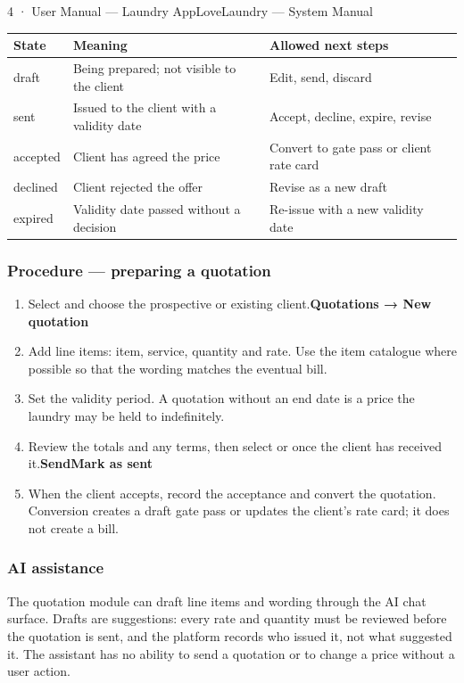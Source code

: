 \documentclass[11pt,a4paper,oneside]{book}
\begin{document}
4 · User Manual — Laundry AppLoveLaundry — System Manual

\begin{center}\small
\begin{tabularx}{\linewidth}{|X|X|X|}
\hline
\rowcolor{lightgrey}
\textbf{State} & \textbf{Meaning} & \textbf{Allowed next steps} \\ \hline
draft & Being prepared; not visible to the client & Edit, send, discard \\ \hline
sent & Issued to the client with a validity date & Accept, decline, expire, revise \\ \hline
accepted & Client has agreed the price & Convert to gate pass or client rate card \\ \hline
declined & Client rejected the offer & Revise as a new draft \\ \hline
expired & Validity date passed without a decision & Re-issue with a new validity date \\ \hline
\end{tabularx}
\end{center}
\subsubsection*{Procedure — preparing a quotation}
\begin{enumerate}
\item Select  and choose the prospective or existing client.\textbf{Quotations → New quotation}
\item Add line items: item, service, quantity and rate. Use the item catalogue where possible so that the wording matches the eventual bill.
\item Set the validity period. A quotation without an end date is a price the laundry may be held to indefinitely.
\item Review the totals and any terms, then select  or  once the client has received it.\textbf{Send}\textbf{Mark as sent}
\item When the client accepts, record the acceptance and convert the quotation. Conversion creates a draft gate pass or updates the client's rate card; it does not create a bill.
\end{enumerate}
\subsubsection*{AI assistance}
The quotation module can draft line items and wording through the AI chat surface. Drafts are suggestions: every rate and quantity must be reviewed before the quotation is sent, and the platform records who issued it, not what suggested it. The assistant has no ability to send a quotation or to change a price without a user action.
\end{document}
